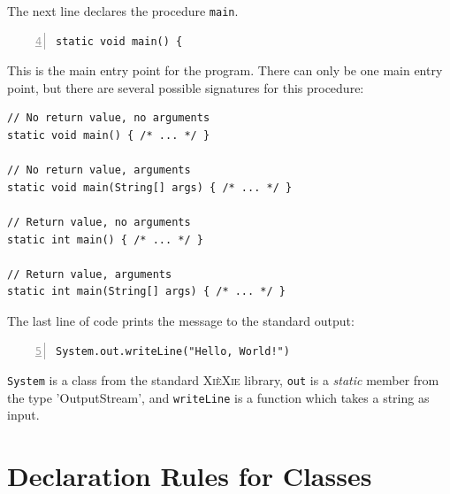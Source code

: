 \documentclass[a5paper]{report}
\def\xiexie{\textsc{Xi\`eXie}\xspace}
\begin{document}
The next line declares the procedure \texttt{main}.
\begin{lstlisting}[numbers=left, firstnumber=4]
static void main() {
\end{lstlisting}
This is the main entry point for the program. There can only be one main entry point, but there are several possible
signatures for this procedure:
\begin{lstlisting}
// No return value, no arguments
static void main() { /* ... */ }

// No return value, arguments
static void main(String[] args) { /* ... */ }

// Return value, no arguments
static int main() { /* ... */ }

// Return value, arguments
static int main(String[] args) { /* ... */ }
\end{lstlisting}

The last line of code prints the message to the standard output:
\begin{lstlisting}[numbers=left, firstnumber=5]
System.out.writeLine("Hello, World!")
\end{lstlisting}
\texttt{System} is a class from the standard \xiexie library, \texttt{out} is a \textit{static} member
from the type 'OutputStream', and \texttt{writeLine} is a function which takes a string as input.



\section{Declaration Rules for Classes}
\end{document}
